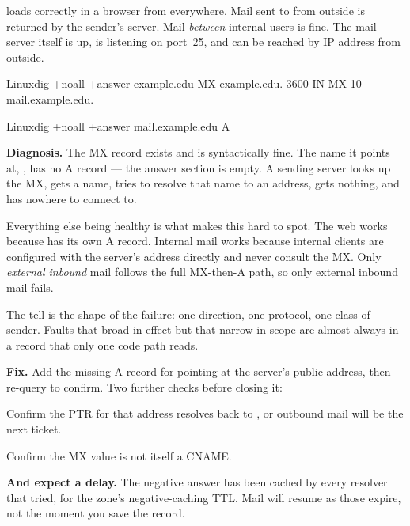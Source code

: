 \begin{breakfix}
 loads correctly in a browser from everywhere. Mail sent to
 from outside is returned by the sender's server. Mail
\emph{between} internal users is fine. The mail server itself is up, is listening
on port~25, and can be reached by IP address from outside.

\begin{hostcmd}{Linux}{dig +noall +answer example.edu MX}
example.edu.        3600    IN    MX    10 mail.example.edu.
\end{hostcmd}

\begin{hostcmd}{Linux}{dig +noall +answer mail.example.edu A}
\end{hostcmd}

\textbf{Diagnosis.} The MX record exists and is syntactically fine. The name it
points at, , has no A record --- the answer section is
empty. A sending server looks up the MX, gets a name, tries to resolve that name
to an address, gets nothing, and has nowhere to connect to.

Everything else being healthy is what makes this hard to spot. The web works
because  has its own A record. Internal mail works because internal
clients are configured with the server's address directly and never consult the
MX. Only \emph{external inbound} mail follows the full MX-then-A path, so only
external inbound mail fails.

The tell is the shape of the failure: one direction, one protocol, one class of
sender. Faults that broad in effect but that narrow in scope are almost always in
a record that only one code path reads.

\textbf{Fix.} Add the missing A record for  pointing at the
server's public address, then re-query to confirm. Two further checks before
closing it:

\begin{tight}
  \item Confirm the PTR for that address resolves back to
        , or outbound mail will be the next ticket.
  \item Confirm the MX value is not itself a CNAME.
\end{tight}

\textbf{And expect a delay.} The negative answer has been cached by every
resolver that tried, for the zone's negative-caching TTL. Mail will resume as
those expire, not the moment you save the record.
\end{breakfix}


